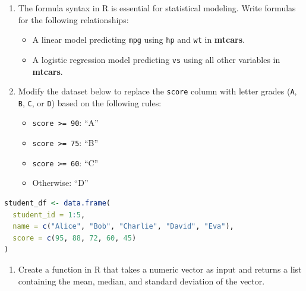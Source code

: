 \documentclass[
]{book}
\newcommand{\passthrough}[1]{#1}
\providecommand{\tightlist}{%
  \setlength{\itemsep}{0pt}\setlength{\parskip}{0pt}}
\theoremstyle{definition}
\theoremstyle{definition}
\theoremstyle{definition}
\theoremstyle{definition}
\theoremstyle{remark}
\begin{document}
\begin{enumerate}
\def\labelenumi{\arabic{enumi}.}
\setcounter{enumi}{17}
\tightlist
\item
  The formula syntax in R is essential for statistical modeling. Write formulas for the following relationships:

  \begin{itemize}
  \tightlist
  \item
    A linear model predicting \passthrough{\lstinline!mpg!} using \passthrough{\lstinline!hp!} and \passthrough{\lstinline!wt!} in \textbf{mtcars}.\\
  \item
    A logistic regression model predicting \passthrough{\lstinline!vs!} using all other variables in \textbf{mtcars}.\\
  \end{itemize}
\item
  Modify the dataset below to replace the \passthrough{\lstinline!score!} column with letter grades (\passthrough{\lstinline!A!}, \passthrough{\lstinline!B!}, \passthrough{\lstinline!C!}, or \passthrough{\lstinline!D!}) based on the following rules:

  \begin{itemize}
  \tightlist
  \item
    \passthrough{\lstinline!score >= 90!}: ``A''\\
  \item
    \passthrough{\lstinline!score >= 75!}: ``B''\\
  \item
    \passthrough{\lstinline!score >= 60!}: ``C''\\
  \item
    Otherwise: ``D''
  \end{itemize}
\end{enumerate}

\begin{lstlisting}[language=R]
student_df <- data.frame(
  student_id = 1:5,
  name = c("Alice", "Bob", "Charlie", "David", "Eva"),
  score = c(95, 88, 72, 60, 45)
)
\end{lstlisting}

\begin{enumerate}
\def\labelenumi{\arabic{enumi}.}
\setcounter{enumi}{19}
\tightlist
\item
  Create a function in R that takes a numeric vector as input and returns a list containing the mean, median, and standard deviation of the vector.
\end{enumerate}
\end{document}

